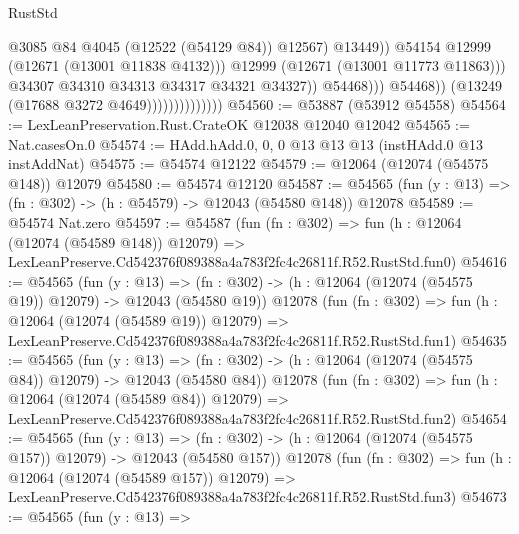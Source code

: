 \begin{lexlean}{RustStd}
\begin{coremodule}
                                                    @3085
                                                    @84
                                                    @4045
                                                    (@12522 (@54129 @84))
                                                    @12567)
                                                  @13449))
                                              @54154
                                              @12999
                                              (@12671 (@13001 @11838 @4132)))
                                            @12999
                                            (@12671 (@13001 @11773 @11863)))
                                          @34307
                                          @34310
                                          @34313
                                          @34317
                                          @34321
                                          @34327))
                                      @54468)))
                                @54468))
                            (@13249 (@17688 @3272 @4649))))))))))))))
@54560 := @53887 (@53912 @54558)
@54564 := LexLeanPreservation.Rust.CrateOK @12038 @12040 @12042
@54565 := Nat.casesOn.{0}
@54574 := HAdd.hAdd.{0, 0, 0} @13 @13 @13 (instHAdd.{0} @13 instAddNat)
@54575 := @54574 @12122
@54579 := @12064 (@12074 (@54575 @148)) @12079
@54580 := @54574 @12120
@54587 := @54565 (fun (y : @13) => (fn : @302) -> (h : @54579) -> @12043 (@54580 @148)) @12078
@54589 := @54574 Nat.zero
@54597 := @54587
    (fun (fn : @302) =>
    fun (h : @12064 (@12074 (@54589 @148)) @12079) =>
    LexLeanPreserve.Cd542376f089388a4a783f2fc4c26811f.R52.RustStd.fun0)
@54616 := @54565
    (fun (y : @13) =>
    (fn : @302) -> (h : @12064 (@12074 (@54575 @19)) @12079) -> @12043 (@54580 @19))
    @12078
    (fun (fn : @302) =>
    fun (h : @12064 (@12074 (@54589 @19)) @12079) =>
    LexLeanPreserve.Cd542376f089388a4a783f2fc4c26811f.R52.RustStd.fun1)
@54635 := @54565
    (fun (y : @13) =>
    (fn : @302) -> (h : @12064 (@12074 (@54575 @84)) @12079) -> @12043 (@54580 @84))
    @12078
    (fun (fn : @302) =>
    fun (h : @12064 (@12074 (@54589 @84)) @12079) =>
    LexLeanPreserve.Cd542376f089388a4a783f2fc4c26811f.R52.RustStd.fun2)
@54654 := @54565
    (fun (y : @13) =>
    (fn : @302) -> (h : @12064 (@12074 (@54575 @157)) @12079) -> @12043 (@54580 @157))
    @12078
    (fun (fn : @302) =>
    fun (h : @12064 (@12074 (@54589 @157)) @12079) =>
    LexLeanPreserve.Cd542376f089388a4a783f2fc4c26811f.R52.RustStd.fun3)
@54673 := @54565
    (fun (y : @13) =>

\end{coremodule}
\end{lexlean}
